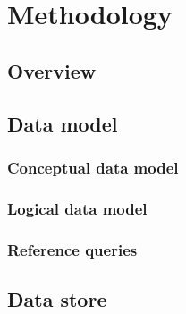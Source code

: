 
\chapter{Methodology}
\label{ch:methodology}


\section{Overview}
\label{sec:overview}



\section{Data model}
\label{sec:data-model}


\subsection{Conceptual data model}
\label{sec:conceptual-data-model}

\subsection{Logical data model}
\label{sec:logical-data-model}

\subsection{Reference queries}
\label{sec:reference-queries}


\section{Data store}
\label{sec:data-store}


